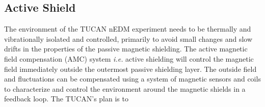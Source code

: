 















\subsection{Active Shield}\label{sec:amc}

The environment of the TUCAN nEDM experiment needs to be thermally and vibrationally isolated and controlled, primarily to avoid small changes and slow drifts in the properties of the passive magnetic shielding. The active magnetic field compensation (AMC) system {\it i.e.} active shielding will control the magnetic field immediately outside the outermost passive shielding layer. The outside field and fluctuations can be compensated using a system of magnetic sensors and coils to characterize and control the environment around the magnetic shields in a feedback loop. The TUCAN's plan is to

